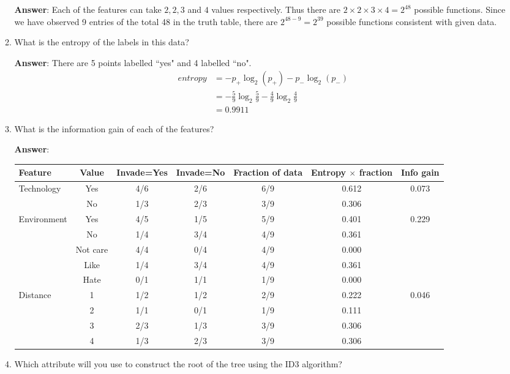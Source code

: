 \documentclass{article}
\begin{document}
\begin{enumerate}
\begin{enumerate}
    
    \textbf{Answer}: Each of the features can take $2, 2, 3$ and $4$ values respectively. Thus there are  $2 \times 2 \times 3 \times 4 =2^{48}$ possible functions. Since we have observed 9 entries of the total 48 in the truth table, there are $2^{48-9} = 2^{39}$ possible functions consistent with given data.
    
    \item What is the entropy of the labels in this data?
    
    \textbf{Answer}: There are 5 points labelled ``yes" and 4 labelled ``no". 
    \begin{align*}
        entropy &= -p_{+} \log_2(p_+) - p_{-} \log_2(p_{-})\\ 
                &= -\frac{5}{9} \log_2\frac{5}{9} - \frac{4}{9} \log_2\frac{4}{9}\\
                &= 0.9911
    \end{align*}
    
    \item What is the information gain of each of the features?
    
    \textbf{Answer}: 
    \begin{table}[H]
    \centering
        \begin{tabular}{|l|ccccc|c|}
            \hline
            Feature & Value & Invade=Yes & Invade=No & Fraction of data & Entropy $\times$ fraction & Info gain \\ \hline
            \multirow{2}{*}{Technology} & Yes & 4/6 & 2/6 & 6/9 & 0.612 & \multirow{2}{*}{0.073}\\
             & No & 1/3 & 2/3 & 3/9 & 0.306 & \\ \hline
            \multirow{2}{*}{Environment} & Yes & 4/5 & 1/5 & 5/9 & 0.401 & \multirow{2}{*}{0.229}\\
             & No & 1/4 & 3/4 & 4/9 & 0.361 & \\ \hline
            \textbf{\multirow{3}{*}{Human}} & Not care & 4/4 & 0/4 & 4/9 & 0.000 & \textbf{\multirow{2}{*}{0.6305}}\\
             & Like & 1/4 & 3/4 & 4/9 & 0.361 & \\
             & Hate & 0/1 & 1/1 & 1/9 & 0.000 & \\ \hline
            \multirow{4}{*}{Distance} & 1 & 1/2 & 1/2 & 2/9 & 0.222 & \multirow{4}{*}{0.046}\\
             & 2 & 1/1 & 0/1 & 1/9 & 0.111 & \\
             & 3 & 2/3 & 1/3 & 3/9 & 0.306 & \\
             & 4 & 1/3 & 2/3 & 3/9 & 0.306 & \\ \hline
        \end{tabular}
    \end{table}
    \item Which attribute will you use to construct the root of the tree using the ID3 algorithm?
    

\end{enumerate}
\end{enumerate}
\end{document}
